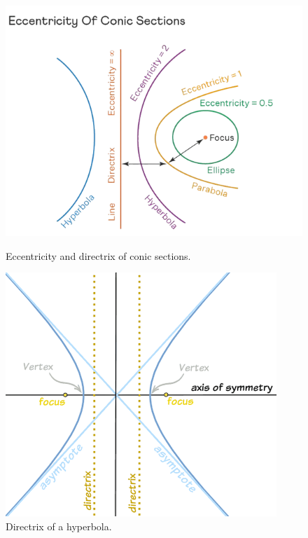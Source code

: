 \documentclass{article}
\begin{document}
\begin{illustrationbox}
    \begin{figure}[H]
        \centering
        \begin{minipage}{0.45\textwidth}
            \centering
            \includegraphics[width=\linewidth]{eccentricity and directrix.png}
            \caption{Eccentricity and directrix of conic sections.}
        \end{minipage}
        \hfill
        \begin{minipage}{0.45\textwidth}
            \centering
            \includegraphics[width=\linewidth]{hyperbola directrix.png}
            \caption{Directrix of a hyperbola.}
        \end{minipage}
        

\end{figure}
\end{illustrationbox}
\end{document}
